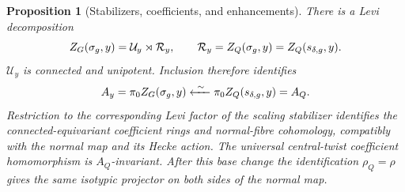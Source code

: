 \documentclass[10pt,a4paper]{amsart}
\newtheorem{proposition}[theorem]{Proposition}
\begin{document}
\begin{proposition}[Stabilizers, coefficients, and enhancements]
\label{prop:two-component-groups}
There is a Levi decomposition
\begin{equation}\label{eq:component-stabilizers}
 Z_G(\sigma_{\rm g},y)=\mathcal U_y\rtimes\mathcal R_y,
 \qquad
 \mathcal R_y=Z_Q(\sigma_{\rm g},y)=Z_Q(s_{\delta,{\rm g}},y).
\end{equation}
$\mathcal U_y$ is connected and unipotent.  Inclusion therefore identifies
\[
 A_y=\pi_0Z_G(\sigma_{\rm g},y)
 \xleftarrow{\ \sim\ }
 \pi_0Z_Q(s_{\delta,{\rm g}},y)=A_Q.
\]
Restriction to the corresponding Levi factor of the scaling stabilizer
identifies the connected-equivariant coefficient rings and normal-fibre
cohomology, compatibly with the normal map and its Hecke action.
The universal central-twist coefficient homomorphism is $A_Q$-invariant.
After this base change the identification $\rho_Q=\rho$ gives the same
isotypic projector on both sides of the normal map.
\end{proposition}
\end{document}
